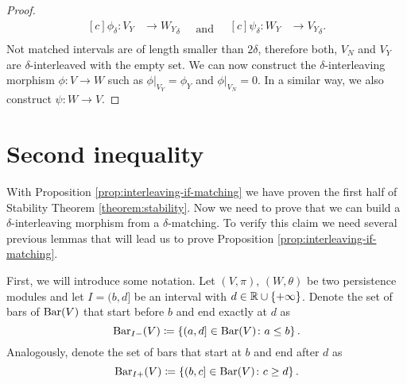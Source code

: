 \begin{proof}
\begin{equation*}
\begin{aligned}[c]
        \phi_\delta\colon V_Y &\to {W_Y}_\delta\\
        \end{aligned}
        \quad \text{and} \quad
        \begin{aligned}[c]
        \psi_\delta\colon W_Y &\to {V_Y}_\delta.\\
        \end{aligned}
    \end{equation*}
    Not matched intervals are of length smaller than $ 2 \delta $, therefore both, $V_N$ and $V_Y$ are $\delta$-interleaved with the empty set. We can now construct the $\delta$-interleaving morphism $ \phi\colon V \to W$ such as $\phi \vert_{V_Y} = \phi_Y$ and $\phi \vert_{V_N} = 0$. In a similar way, we also construct $ \psi\colon W \to V$.
\end{proof}

\section{Second inequality}

With Proposition \ref{prop:interleaving-if-matching} we have proven the first half of Stability Theorem \ref{theorem:stability}. Now we need to prove that we can build a $\delta$-interleaving morphism from a $\delta$-matching. To verify this claim we need several previous lemmas that will lead us to prove Proposition \ref{prop:interleaving-if-matching}.

First, we will introduce some notation. Let $(V, \pi)$, $(W, \theta)$ be two persistence modules and let $ I = (b, d]$ be an interval with $ d \in \mathbb R \cup \{+ \infty\}$. Denote the set of bars of $\operatorname{Bar}(V)$ that start before $b$ and end exactly at $d$ as
$$
    \operatorname{Bar}_{I-}(V) \coloneq \left\{ (a, d] \in \operatorname{Bar}(V) \colon a \leq b\right\}.
$$
Analogously, denote the set of bars that start at $b$ and end after $d$ as
$$
    \operatorname{Bar}_{I+}(V) \coloneq \left\{ (b, c] \in \operatorname{Bar}(V) \colon c \geq d\right\}.
$$

